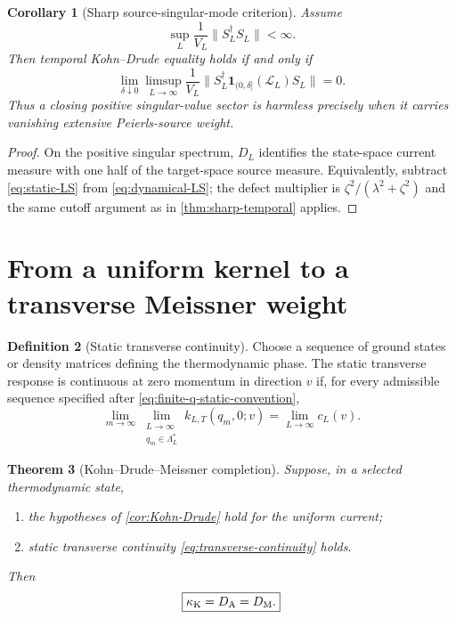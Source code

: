 \documentclass[11pt]{article}
\newtheorem{theorem}{Theorem}[section]
\newtheorem{corollary}[theorem]{Corollary}
\theoremstyle{definition}
\newtheorem{definition}[theorem]{Definition}
\theoremstyle{remark}
\newcommand{\cL}{\mathcal L}
\newcommand{\norm}[1]{\lVert #1\rVert}
\begin{document}
\begin{corollary}[Sharp source-singular-mode criterion]
\label{cor:source-criterion}
Assume
\begin{equation}
 \sup_L\frac1{V_L}\norm{S_L^\dagger S_L}<\infty.
\end{equation}
Then temporal Kohn--Drude equality holds if and only if
\begin{equation}
 \lim_{\delta\downarrow0}\limsup_{L\to\infty}
 \frac1{V_L}\norm{S_L^\dagger\mathbf1_{(0,\delta]}(\cL_L)S_L}=0.
 \label{eq:source-tightness}
\end{equation}
Thus a closing positive singular-value sector is harmless precisely when it carries vanishing extensive
Peierls-source weight.
\end{corollary}

\begin{proof}
On the positive singular spectrum, $D_L$ identifies the state-space current measure with one half of the
target-space source measure.  Equivalently, subtract \eqref{eq:static-LS} from
\eqref{eq:dynamical-LS}; the defect multiplier is $\zeta^2/(\lambda^2+\zeta^2)$ and the same cutoff
argument as in \cref{thm:sharp-temporal} applies.
\end{proof}

\section{From a uniform kernel to a transverse Meissner weight}
\label{sec:transverse-general}

\begin{definition}[Static transverse continuity]
Choose a sequence of ground states or density matrices defining the thermodynamic phase.  The static
transverse response is continuous at zero momentum in direction $v$ if, for every admissible sequence
specified after \eqref{eq:finite-q-static-convention},
\begin{equation}
 \lim_{m\to\infty}\lim_{\substack{L\to\infty\\q_m\in\Lambda_L^*}}
 k_{L,T}(q_m,0;v)
 =\lim_{L\to\infty}c_L(v).
 \label{eq:transverse-continuity}
\end{equation}
\end{definition}

\begin{theorem}[Kohn--Drude--Meissner completion]
\label{thm:general-completion}
Suppose, in a selected thermodynamic state,
\begin{enumerate}[label=\textup{(\roman*)},leftmargin=2.6em]
\item the hypotheses of \cref{cor:Kohn-Drude} hold for the uniform current;
\item static transverse continuity \eqref{eq:transverse-continuity} holds.
\end{enumerate}
Then
\begin{equation}
 \boxed{\kappa_{\rm K}=D_{\rm A}=D_{\rm M}.}
 \label{eq:three-equal-general}
\end{equation}
\end{theorem}
\end{document}
